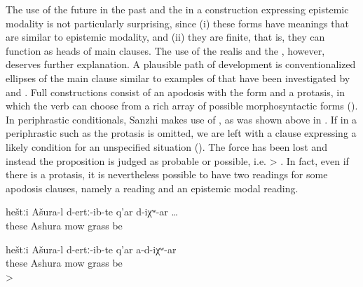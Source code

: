 The use of the future in the past and the  in a construction expressing epistemic modality is not particularly surprising, since (i) these forms have meanings that are similar to epistemic modality, and (ii) they are finite, that is, they can function as heads of main clauses. The use of the realis  and the , however, deserves further explanation. A plausible path of development is conventionalized ellipses of the main clause similar to examples of  that have been investigated by \citet{Evans2007} and \citet{EvansWatanabe2016}. Full  constructions consist of an apodosis with the  form and a protasis, in which the verb can choose from a rich array of possible morphosyntactic forms (). In periphrastic conditionals, Sanzhi makes use of , as was shown above in . If in a periphrastic  such as  the protasis is omitted, we are left with a clause expressing a likely condition for an unspecified situation (). The  force has been lost and instead the proposition is judged as probable or possible, i.e.  >  . In fact, even if there is a protasis, it is nevertheless possible to have two readings for some apodosis clauses, namely a  reading and an epistemic modal reading.

\begin{exe}
	\ex	\label{ex:Ashura mows the lawn}
	\begin{xlist}
		\ex	\label{ex:‎‎If Ashura has mowed this grass@A}
		\gll	heštːi	Ašura-l d-ertː-ib-te	q'ar	d-iχʷ-ar \ldots\\
			these	Ashura	mow 	grass be\\
		\glt	{}

		\ex	\label{ex:‎‎If Ashura has not mowed this grass@B}
		\gll	heštːi	Ašura-l d-ertː-ib-te	q'ar	a-d-iχʷ-ar \\
			these	Ashura	mow 	grass be\\
		\glt	{} > 
	\end{xlist}
\end{exe}


